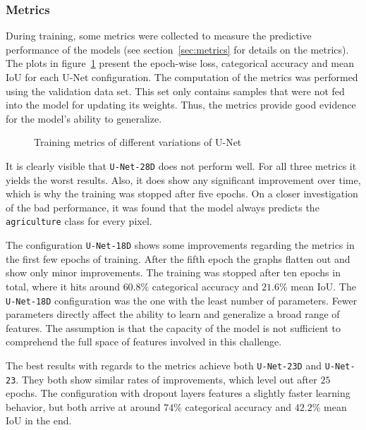 \subsubsection{Metrics}
During training, some metrics were collected to measure the predictive performance of the models (see section~\ref{sec:metrics} for details on the metrics). The plots in figure~\ref{fig:unet_train_metrics} present the epoch-wise loss, categorical accuracy and mean IoU for each U-Net configuration. The computation of the metrics was performed using the validation data set. This set only contains samples that were not fed into the model for updating its weights. Thus, the metrics provide good evidence for the model's ability to generalize.

\begin{figure}
    \newcommand{\UnetMetricsImageWidth}{0.32\textwidth}
    \centering
            
    \caption{Training metrics of different variations of U-Net}
    \label{fig:unet_train_metrics}
\end{figure}

It is clearly visible that \texttt{U-Net-28D} does not perform well. For all three metrics it yields the worst results. Also, it does show any significant improvement over time, which is why the training was stopped after five epochs. On a closer investigation of the bad performance, it was found that the model always predicts the \texttt{agriculture} class for every pixel.

The configuration \texttt{U-Net-18D} shows some improvements regarding the metrics in the first few epochs of training. After the fifth epoch the graphs flatten out and show only minor improvements. The training was stopped after ten epochs in total, where it hits around $60.8\%$ categorical accuracy and $21.6\%$ mean IoU. The \texttt{U-Net-18D} configuration was the one with the least number of parameters. Fewer parameters directly affect the ability to learn and generalize a broad range of features. The assumption is that the capacity of the model is not sufficient to comprehend the full space of features involved in this challenge.

The best results with regards to the metrics achieve both \texttt{U-Net-23D} and \texttt{U-Net-23}. They both show similar rates of improvements, which level out after $25$ epochs. The configuration with dropout layers features a slightly faster learning behavior, but both arrive at around $74\%$ categorical accuracy and $42.2\%$ mean IoU in the end.

